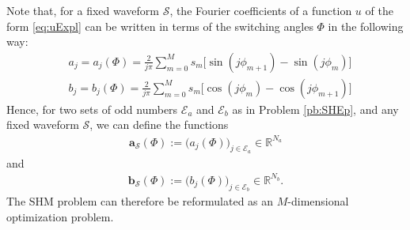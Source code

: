 \documentclass[twocolumn]{autart}    %
\begin{document}
Note that, for a fixed waveform $\mathcal{S}$, the Fourier coefficients of a function $u$ of the form \eqref{eq:uExpl} can be written in terms of the switching angles $\Phi$ in the following way:
\begin{align*}
	& a_j = a_j(\Phi) =  \frac{2}{j\pi} \sum_{m=0}^{M} s_m \Big[\sin(j\phi_{m+1}) -\sin(j\phi_{m})\Big]
	\\[5pt]
	& b_j = b_j(\Phi) = \frac{2}{j\pi} \sum_{m=0}^{M} s_m \Big[\cos(j\phi_{m}) -\cos(j\phi_{m+1})\Big]
\end{align*}
Hence, for two sets of odd numbers $\mathcal{E}_a$ and $\mathcal{E}_b$ as in Problem \ref{pb:SHEp}, and any fixed waveform $\mathcal{S}$, we can define the functions
\begin{align*}
	\bm{a}_\mathcal{S} (\Phi) := \big(a_j (\Phi)\big)_{j\in \mathcal{E}_a} \in \mathbb{R}^{N_a}
\end{align*}
and
\begin{align*}
	\bm{b}_\mathcal{S} (\Phi) := \big(b_j (\Phi)\big)_{j\in \mathcal{E}_b} \in \mathbb{R}^{N_b}.
\end{align*}
The SHM problem can therefore be reformulated as an $M$-dimensional optimization problem.

\bigskip
\end{document}
